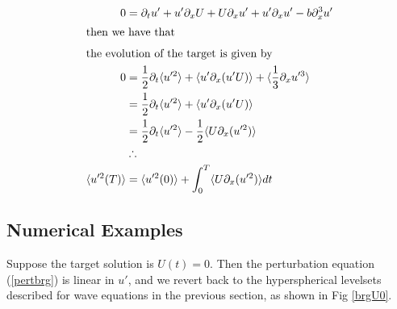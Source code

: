 \documentclass[longbibliography,twocolumn,amsmath,amssymb,aps,nofootinbib]{revtex4-2}
\newcommand{\davg}[1]{\langle {#1} \rangle}
\begin{document}
\begin{align}
  0 &= \partial_t u' + u'\partial_x U + U\partial_x u' + u'\partial_x u' - b\partial_x^3 u'\label{pertbrg}\\
  \intertext{then we have that}
  \intertext{the evolution of the target is given by}
  0 &= \frac{1}{2}\partial_t \davg{u'^2} + \davg{u' \partial_x (u'U)} + \davg{\frac{1}{3}\partial_x u'^3} \nonumber \\
  &= \frac{1}{2}\partial_t \davg{u'^2} +  \davg{u' \partial_x (u'U)} \nonumber \\
  &= \frac{1}{2}\partial_t \davg{u'^2} - \frac{1}{2}\davg{U \partial_x (u'^2)} \nonumber \\
  &\therefore\nonumber\\
  \davg{u'^2(T)} &= \davg{u'^2(0)} + \int_0^T \davg{U \partial_x (u'^2)} dt \label{objburgeq}
\end{align}

\subsection*{Numerical Examples}
Suppose the target solution is $U(t) = 0$. Then the perturbation equation (\ref{pertbrg}) is linear in $u'$, and we revert back to the hyperspherical levelsets described for wave equations in the previous section, as shown in Fig \ref{brgU0}.
\end{document}
